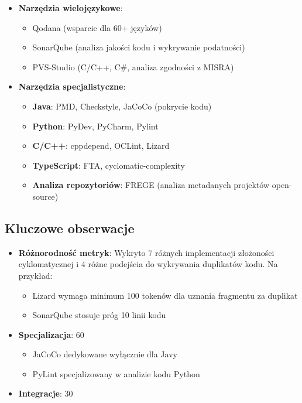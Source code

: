 \documentclass[a4paper,12pt]{article}
\begin{document}
\begin{itemize}
\item \textbf{Narzędzia wielojęzykowe}:
\begin{itemize}
\item Qodana (wsparcie dla 60+ języków)
\item SonarQube (analiza jakości kodu i wykrywanie podatności)
\item PVS-Studio (C/C++, C#, analiza zgodności z MISRA)
\end{itemize}

\item \textbf{Narzędzia specjalistyczne}:
\begin{itemize}
\item \textbf{Java}: PMD, Checkstyle, JaCoCo (pokrycie kodu)
\item \textbf{Python}: PyDev, PyCharm, Pylint
\item \textbf{C/C++}: cppdepend, OCLint, Lizard
\item \textbf{TypeScript}: FTA, cyclomatic-complexity
\item \textbf{Analiza repozytoriów}: FREGE (analiza metadanych projektów open-source)
\end{itemize}
\end{itemize}

\subsection*{Kluczowe obserwacje}
\begin{itemize}
\item \textbf{Różnorodność metryk}: Wykryto 7 różnych implementacji złożoności cyklomatycznej i 4 różne podejścia do wykrywania duplikatów kodu. Na przykład:
\begin{itemize}
\item Lizard wymaga minimum 100 tokenów dla uznania fragmentu za duplikat
\item SonarQube stosuje próg 10 linii kodu
\end{itemize}

\item \textbf{Specjalizacja}: 60%
\begin{itemize}
\item JaCoCo dedykowane wyłącznie dla Javy
\item PyLint specjalizowany w analizie kodu Python
\end{itemize}

\item \textbf{Integracje}: 30%
\end{itemize}
\end{document}
